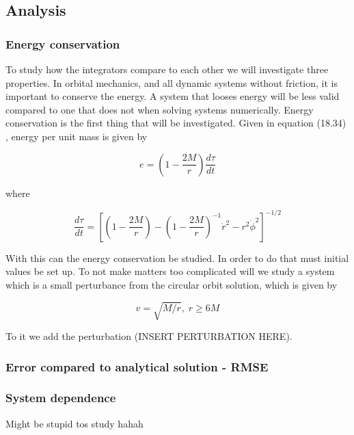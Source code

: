 \subsection{Analysis}

\subsubsection{Energy conservation}
To study how the integrators compare to each other we will investigate three properties. In orbital mechanics, and all dynamic systems without friction, it is important to conserve the energy. A system that looses energy will be less valid compared to one that does not when solving systems numerically. Energy conservation is the first thing that will be investigated. Given in equation (18.34) \cite{gould_2007}, energy per unit mass is given by

\begin{equation}\label{eq:system-energy}
	e = \left(1-\frac{2M}{r}\right)\frac{d\tau}{dt}
\end{equation}

where

\begin{equation}
	\frac{d\tau}{dt} = \left[\left(1-\frac{2M}{r}\right) - \left(1-\frac{2M}{r}\right)^{-1} \dot{r}^2 - r^2 \dot{\phi}^2\right]^{-1/2}	
\end{equation}

With this can the energy conservation be studied. In order to do that must initial values be set up. To not make matters too complicated will we study a system which is a small perturbance from the circular orbit solution, which is given by 

\begin{equation}
	v = \sqrt{M/r}, \; r \geq 6M
\end{equation}

To it we add the perturbation (INSERT PERTURBATION HERE). 

\subsubsection{Error compared to analytical solution - RMSE}

\subsubsection{System dependence}
Might be stupid tos study hahah






